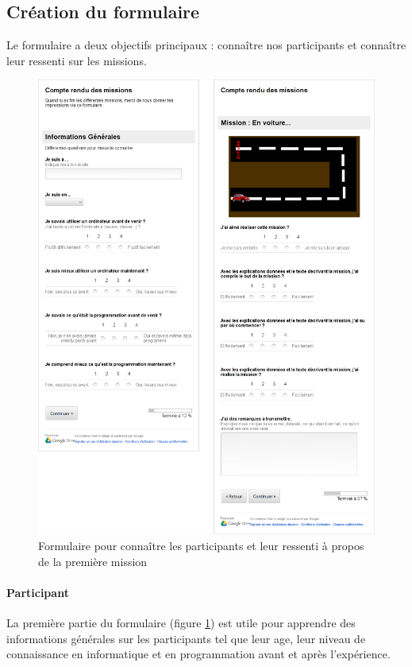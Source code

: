 \subsection{Création du formulaire}
Le formulaire a deux objectifs principaux : connaître nos participants et connaître leur ressenti sur les \glspl{mission}.
\begin{figure}%
  \begin{center}
    \includegraphics[width=\textwidth]{content/8-validation/images/form}
    \caption{Formulaire pour connaître les participants et leur ressenti à propos de la première mission}
    \label{fig:form-user}
  \end{center}
\end{figure}

\paragraph{Participant}
La première partie du formulaire (figure \ref{fig:form-user}) est utile pour apprendre des informations générales sur les participants tel que leur age, leur niveau de connaissance en informatique et en programmation avant et après l'expérience.

